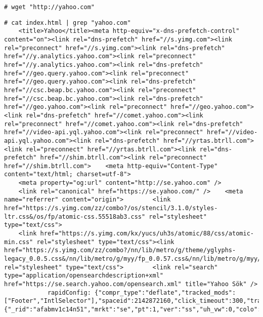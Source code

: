 \begin{verbatim}
# wget "http://yahoo.com"
\end{verbatim}
\begin{verbatim}
# cat index.html | grep "yahoo.com"
    <title>Yahoo</title><meta http-equiv="x-dns-prefetch-control" content="on"><link rel="dns-prefetch" href="//s.yimg.com"><link rel="preconnect" href="//s.yimg.com"><link rel="dns-prefetch" href="//y.analytics.yahoo.com"><link rel="preconnect" href="//y.analytics.yahoo.com"><link rel="dns-prefetch" href="//geo.query.yahoo.com"><link rel="preconnect" href="//geo.query.yahoo.com"><link rel="dns-prefetch" href="//csc.beap.bc.yahoo.com"><link rel="preconnect" href="//csc.beap.bc.yahoo.com"><link rel="dns-prefetch" href="//geo.yahoo.com"><link rel="preconnect" href="//geo.yahoo.com"><link rel="dns-prefetch" href="//comet.yahoo.com"><link rel="preconnect" href="//comet.yahoo.com"><link rel="dns-prefetch" href="//video-api.yql.yahoo.com"><link rel="preconnect" href="//video-api.yql.yahoo.com"><link rel="dns-prefetch" href="//yrtas.btrll.com"><link rel="preconnect" href="//yrtas.btrll.com"><link rel="dns-prefetch" href="//shim.btrll.com"><link rel="preconnect" href="//shim.btrll.com">    <meta http-equiv="Content-Type" content="text/html; charset=utf-8">
    <meta property="og:url" content="http://se.yahoo.com" />
    <link rel="canonical" href="https://se.yahoo.com/" />    <meta name="referrer" content="origin">        <link href="https://s.yimg.com/zz/combo?/os/stencil/3.1.0/styles-ltr.css&/os/fp/atomic-css.55518ab3.css" rel="stylesheet" type="text/css">
    <link href="https://s.yimg.com/kx/yucs/uh3s/atomic/88/css/atomic-min.css" rel="stylesheet" type="text/css"><link href="https://s.yimg.com/zz/combo?/nn/lib/metro/g/theme/yglyphs-legacy_0.0.5.css&/nn/lib/metro/g/myy/fp_0.0.57.css&/nn/lib/metro/g/myy/video_styles_0.0.23.css&/nn/lib/metro/g/sda/fp_sda_0.0.5.css" rel="stylesheet" type="text/css">        <link rel="search" type="application/opensearchdescription+xml" href="https://se.search.yahoo.com/opensearch.xml" title="Yahoo Sök" />
            rapidConfig: {"compr_type":"deflate","tracked_mods":["Footer","IntlSelector"],"spaceid":2142872160,"click_timeout":300,"track_right_click":true,"apv":true,"apv_time":0,"async_all_clicks":false,"compr_on":true,"yql_host":"udc.yahoo.com","yql_path":"\/v2\/public\/yql","test_id":"925","client_only":0,"pageview_on_init":true,"perf_navigationtime":0,"addmodules_timeout":300,"extendbcookie":false,"keys":{"_rid":"afabmv1c14n51","mrkt":"se","pt":1,"ver":"ss","uh_vw":0,"colo":"slw65.fp.ir2.yahoo.com","navtype":"server","nob":1}},

\end{verbatim}
